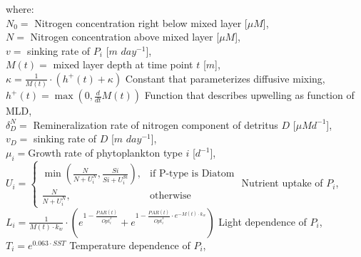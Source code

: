 where:\\
\mbox{} \hspace{0 cm} $N_0=$ Nitrogen concentration right below mixed layer [$\mu M$],\\
\mbox{} \hspace{0 cm} $N=$ Nitrogen concentration above mixed layer [$\mu M$],\\
\mbox{} \hspace{0 cm} $v=$ sinking rate of $P_i$ [$m$ $day^{-1}$],\\
\mbox{} \hspace{0 cm} $M(t)=$ mixed layer depth at time point $t$ [$m$],\\
\mbox{} \hspace{0 cm} $\kappa = \frac{1}{M(t)} \cdot \left(h^{+}(t) + \kappa\right)$ Constant that parameterizes diffusive mixing, \\
\mbox{} \hspace{0 cm} $h^{+}(t) = \max\left(0, \frac{d}{d t} M(t)\right)$ Function that describes upwelling as function of MLD,\\
\mbox{} \hspace{0 cm} $\delta^N_D=$ Remineralization rate of nitrogen component of detritus $D$ [$\mu M d^{-1}$],\\
\mbox{} \hspace{0 cm} $v_D=$ sinking rate of $D$ [$m$ $day^{-1}$],\\
\mbox{} \hspace{0 cm} $\mu_i=$Growth rate of phytoplankton type $i$ [$d^{-1}$],\\
\noindent
\mbox{} \hspace{0 cm} $U_i=\begin{cases}\min\left(\frac{N}{N + U^{N}_i}, \frac{Si}{Si + U^{Si}_i}\right),& \text{if P-type is Diatom}\\\frac{N}{N + U^{N}_i}, & \text{otherwise}\end{cases}$ Nutrient uptake of $P_i$,\\
\noindent
\mbox{} \hspace{0 cm} $L_i=\frac{1}{M(t) \cdot k_{w}} \cdot \left(e^{1 - \frac{PAR(t)}{Opt^{I}_i}} + e^{1 - \frac{PAR(t)}{Opt^{I}_i} \cdot e^{- M(t) \cdot k_{w}}}\right)$ Light dependence of  $P_i$,\\
\mbox{} \hspace{0 cm} $T_i= e^{0.063 \cdot SST}$ Temperature dependence of $P_i$,\\

